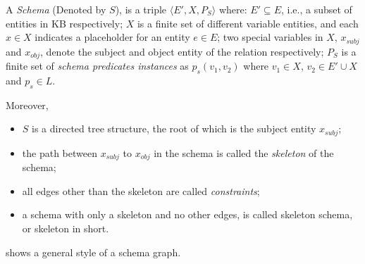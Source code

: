 \begin{definition}
A \textit{Schema} (Denoted by $S$), is a triple
$\langle E', X, P_S \rangle$ where:
  $E' \subseteq E$, i.e.,
  a subset of entities in KB respectively;
  $X$ is a finite set of different variable entities, and  each $x \in X$
  indicates a placeholder for an entity $e \in E$;
  two special variables in $X$, $x_{subj}$ and $x_{obj}$, denote the
  subject and object entity of the relation respectively;
  $P_S$ is a finite set of \textit{schema predicates instances} as
  $p_s(v_1, v_2)$ where $v_1 \in X$, $v_2 \in E' \cup X$
  and $p_s \in L$.

Moreover,
\begin{itemize}
  \itemsep0em
  \item $S$ is a directed tree structure, the root of which is the subject
entity $x_{subj}$;
  \item the path between $x_{subj}$  to $x_{obj}$ in the schema is called
	the {\em skeleton} of the schema;
  \item all edges other than the skeleton are called {\em constraints};
  \item a schema with only a skeleton and no other edges, is called
	 skeleton schema, or skeleton in short.
\end{itemize}

\end{definition}
 shows a general style of a schema graph.

